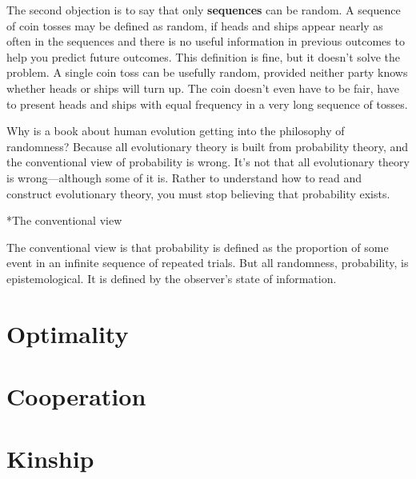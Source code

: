 \documentclass[10pt,reqno]{amsbook}
\makeatletter
\newcommand{\bemph}[1]{{\textbf{\textcolor{bemphcol}{#1}}}}
\renewcommand\section{\@startsection{section}{1}
\z@{.7\linespacing\@plus\linespacing}{.5\linespacing}
{\large\bfseries\itshape}}
\numberwithin{equation}{chapter}
\makeatother
\begin{document}
The second objection is to say that only \bemph{sequences} can be random. A sequence of coin tosses may be defined as random, if heads and ships appear nearly as often in the sequences and there is no useful information in previous outcomes to help you predict future outcomes. This definition is fine, but it doesn't solve the problem. A single coin toss can be usefully random, provided neither party knows whether heads or ships will turn up. The coin doesn't even have to be fair, have to present heads and ships with equal frequency in a very long sequence of tosses.

Why is a book about human evolution getting into the philosophy of randomness? Because all evolutionary theory is built from probability theory, and the conventional view of probability is wrong. It's not that all evolutionary theory is wrong---although some of it is. Rather to understand how to read and construct evolutionary theory, you must stop believing that probability exists.

\section*{The conventional view}

The conventional view is that probability is defined as the proportion of some event in an infinite sequence of repeated trials. But all randomness, probability, is epistemological. It is defined by the observer's state of information. 



\def \chapterElement {O}
\chapter{Optimality}

\lipsum[15-17]



\def \chapterElement {C}
\chapter{Cooperation}

\lipsum[12-14]


\def \chapterElement {K}
\chapter{Kinship}
\end{document}
